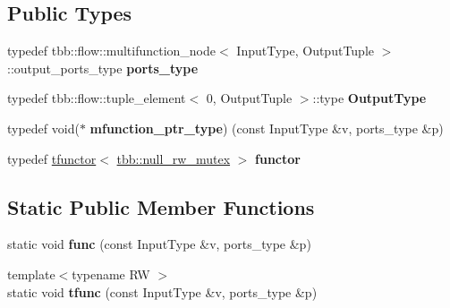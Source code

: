 \subsection*{Public Types}
\begin{DoxyCompactItemize}
\item 
\hypertarget{structharness__graph__multifunction__executor_aba4d89577f59d4cc5f485aabde3b494e}{}typedef tbb\+::flow\+::multifunction\+\_\+node$<$ Input\+Type, Output\+Tuple $>$\+::output\+\_\+ports\+\_\+type {\bfseries ports\+\_\+type}\label{structharness__graph__multifunction__executor_aba4d89577f59d4cc5f485aabde3b494e}

\item 
\hypertarget{structharness__graph__multifunction__executor_a9778fe18f160b30462f2c5464d04597c}{}typedef tbb\+::flow\+::tuple\+\_\+element$<$ 0, Output\+Tuple $>$\+::type {\bfseries Output\+Type}\label{structharness__graph__multifunction__executor_a9778fe18f160b30462f2c5464d04597c}

\item 
\hypertarget{structharness__graph__multifunction__executor_a8a8b20c5f99325e51e8c28b0e960c3b7}{}typedef void($\ast$ {\bfseries mfunction\+\_\+ptr\+\_\+type}) (const Input\+Type \&v, ports\+\_\+type \&p)\label{structharness__graph__multifunction__executor_a8a8b20c5f99325e51e8c28b0e960c3b7}

\item 
\hypertarget{structharness__graph__multifunction__executor_a1767461c4605f17b8f8d5e0a92fd2262}{}typedef \hyperlink{structharness__graph__multifunction__executor_1_1tfunctor}{tfunctor}$<$ \hyperlink{classtbb_1_1null__rw__mutex}{tbb\+::null\+\_\+rw\+\_\+mutex} $>$ {\bfseries functor}\label{structharness__graph__multifunction__executor_a1767461c4605f17b8f8d5e0a92fd2262}

\end{DoxyCompactItemize}
\subsection*{Static Public Member Functions}
\begin{DoxyCompactItemize}
\item 
\hypertarget{structharness__graph__multifunction__executor_a4e901a06738818182fb95f23a2e51be1}{}static void {\bfseries func} (const Input\+Type \&v, ports\+\_\+type \&p)\label{structharness__graph__multifunction__executor_a4e901a06738818182fb95f23a2e51be1}

\item 
\hypertarget{structharness__graph__multifunction__executor_a8e20acb2bcf840b92b474eceb8b554fe}{}{\footnotesize template$<$typename R\+W $>$ }\\static void {\bfseries tfunc} (const Input\+Type \&v, ports\+\_\+type \&p)\label{structharness__graph__multifunction__executor_a8e20acb2bcf840b92b474eceb8b554fe}

\end{DoxyCompactItemize}
